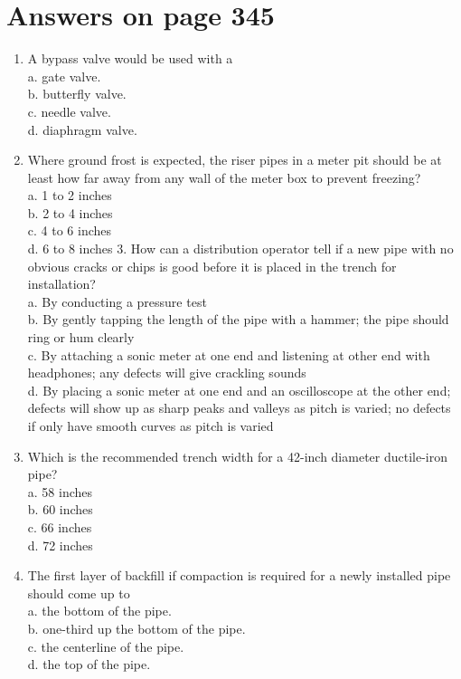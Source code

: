 \documentclass[10pt]{article}
\begin{document}
\section{Answers on page 345}
\begin{enumerate}
  \item A bypass valve would be used with a\\
a. gate valve.\\
b. butterfly valve.\\
c. needle valve.\\
d. diaphragm valve.

  \item Where ground frost is expected, the riser pipes in a meter pit should be at least how far away from any wall of the meter box to prevent freezing?\\
a. 1 to 2 inches\\
b. 2 to 4 inches\\
c. 4 to 6 inches\\
d. 6 to 8 inches 3. How can a distribution operator tell if a new pipe with no obvious cracks or chips is good before it is placed in the trench for installation?\\
a. By conducting a pressure test\\
b. By gently tapping the length of the pipe with a hammer; the pipe should ring or hum clearly\\
c. By attaching a sonic meter at one end and listening at other end with headphones; any defects will give crackling sounds\\
d. By placing a sonic meter at one end and an oscilloscope at the other end; defects will show up as sharp peaks and valleys as pitch is varied; no defects if only have smooth curves as pitch is varied

  \item Which is the recommended trench width for a 42-inch diameter ductile-iron pipe?\\
a. 58 inches\\
b. 60 inches\\
c. 66 inches\\
d. 72 inches

  \item The first layer of backfill if compaction is required for a newly installed pipe should come up to\\
a. the bottom of the pipe.\\
b. one-third up the bottom of the pipe.\\
c. the centerline of the pipe.\\
d. the top of the pipe.

\end{enumerate}
\end{document}
